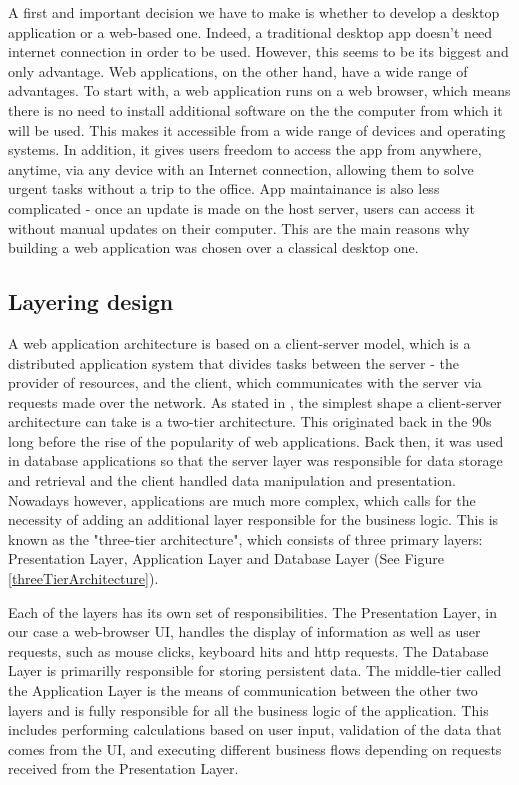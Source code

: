 A first and important decision we have to make is whether to develop a desktop application or a web-based one. Indeed, a traditional desktop app doesn't need internet connection in order to be used. However, this seems to be its biggest and only advantage. Web applications, on the other hand, have a wide range of advantages. To start with, a web application runs on a web browser, which means there is no need to install additional software on the the computer from which it will be used. This makes it accessible from a wide range of devices and operating systems. In addition, it gives users freedom to access the app from anywhere, anytime, via any device with an Internet connection, allowing them to solve urgent tasks without a trip to the office. App maintainance is also less complicated - once an update is made on the host server, users can access it without manual updates on their computer. This are the main reasons why building a web application was chosen over a classical desktop one.

\subsection{Layering design}
\label{subsection:layeringDesign}

A web application architecture is based on a client-server model, which is a distributed application system that divides tasks between the server - the provider of resources, and the client, which communicates with the server via requests made over the network. As stated in \cite{databaseProgrammingWithJdbcAndJava}, the simplest shape a client-server architecture can take is a two-tier architecture. This originated back in the 90s long before the rise of the popularity of web applications. Back then, it was used in database applications so that the server layer was responsible for data storage and retrieval and the client handled data manipulation and presentation. Nowadays however, applications are much more complex, which calls for the necessity of adding an additional layer responsible for the business logic. This is known as the "three-tier architecture", which consists of three primary layers: Presentation Layer, Application Layer and Database Layer (See Figure \ref{threeTierArchitecture}).

Each of the layers has its own set of responsibilities. The Presentation Layer, in our case a web-browser UI, handles the display of information as well as user requests, such as mouse clicks, keyboard hits and http requests. The Database Layer is primarilly responsible for storing persistent data. The middle-tier called the Application Layer is the means of communication between the other two layers and is fully responsible for all the business logic of the application. This includes performing calculations based on user input, validation of the data that comes from the UI, and executing different business flows depending on requests received from the Presentation Layer.

